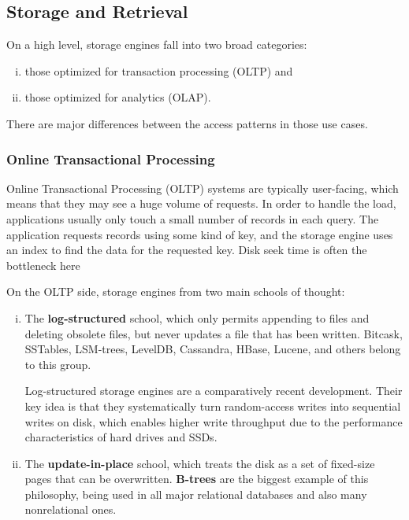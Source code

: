 \documentclass{article}
\begin{document}
    
    \subsection{Storage and Retrieval }
    On a high level, storage engines fall into two broad categories: 
    \begin{enumerate}[i.]
        \item  those optimized for transaction processing (OLTP) and
        \item those optimized for analytics (OLAP).
    \end{enumerate}
    
    There are major differences between the access patterns in those use cases.
    
    \subsubsection{Online Transactional Processing}
    Online Transactional Processing (OLTP) systems are typically user-facing, which means that they may see a huge volume of requests. In order to handle the load, applications usually only touch a small number of records in each query. The application requests records using some kind of key, and the storage engine uses an index to find the data for the requested key. Disk seek time is often the bottleneck here
    
    On the OLTP side, storage engines from two main schools of thought:
    
    \begin{enumerate}[i.]
        \item The \textbf{log-structured} school, which only permits appending to files and deleting obsolete files, but never updates a file that has been written. Bitcask, SSTables, LSM-trees, LevelDB, Cassandra, HBase, Lucene, and others belong to this group.
        
        Log-structured storage engines are a comparatively recent development. Their key idea is that they systematically turn random-access writes into sequential writes on disk, which enables higher write throughput due to the performance characteristics of hard drives and SSDs.
        
        \item The \textbf{update-in-place} school, which treats the disk as a set of fixed-size pages that can be overwritten. \textbf{B-trees} are the biggest example of this philosophy, being used in all major relational databases and also many nonrelational ones.
    \end{enumerate}
    
\end{document}
